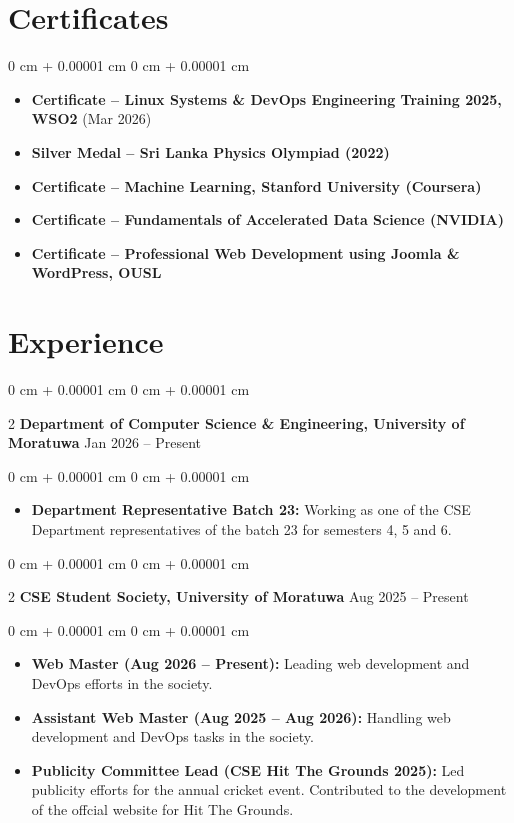 \documentclass[10pt, letterpaper]{article}
\newenvironment{highlights}{ \begin{itemize}[ topsep=0.10 cm, parsep=0.10 cm, partopsep=0pt,
itemsep=0pt, leftmargin=0 cm + 10pt ] }{ \end{itemize} } %
\newenvironment{onecolentry}{ \begin{adjustwidth}{ 0 cm + 0.00001 cm }{ 0 cm + 0.00001 cm }
}{ \end{adjustwidth} } %
\newenvironment{twocolentry}[2][]{ \onecolentry \def\secondColumn{#2} \setcolumnwidth{\fill, 4.5 cm}
\begin{paracol}{2} }{ \switchcolumn \raggedleft \secondColumn \end{paracol}
\endonecolentry } %
\begin{document}
  \section{Certificates}
  \begin{onecolentry}
    \begin{highlights}
      \item \textbf{Certificate – Linux Systems \& DevOps Engineering Training
      2025, WSO2} (Mar 2026) \item \textbf{Silver Medal – Sri Lanka Physics Olympiad (2022)} \item
      \textbf{Certificate – Machine Learning, Stanford University (Coursera)} \item
      \textbf{Certificate – Fundamentals of Accelerated Data Science (NVIDIA)}
      \item \textbf{Certificate – Professional Web Development using Joomla \&
      WordPress, OUSL}
    \end{highlights}
  \end{onecolentry}

  \section{Experience}
  \begin{twocolentry}
    {Jan 2026 -- Present} \textbf{Department of Computer Science \& Engineering, University of Moratuwa}
  \end{twocolentry}
  \vspace{0.10 cm}
  \begin{onecolentry}
    \begin{highlights}
      \item \textbf{Department Representative Batch 23:} Working as one of the CSE Department representatives of the
      batch 23 for semesters 4, 5 and 6.
    \end{highlights}
  \end{onecolentry}

  \vspace{0.2 cm}

  \begin{twocolentry}
    {Aug 2025 -- Present} \textbf{CSE Student Society, University of Moratuwa}
  \end{twocolentry}
  \vspace{0.10 cm}
  \begin{onecolentry}
    \begin{highlights}
      \item \textbf{Web Master (Aug 2026 -- Present):} Leading web development
      and DevOps efforts in the society. \item \textbf{Assistant Web Master
      (Aug 2025 -- Aug 2026):} Handling web development and DevOps
      tasks in the society. \item \textbf{Publicity
      Committee Lead (CSE Hit The Grounds 2025):} Led publicity efforts for the
      annual cricket event. Contributed to the development of the offcial website
      for Hit The Grounds.
    \end{highlights}
  \end{onecolentry}
\end{document}
